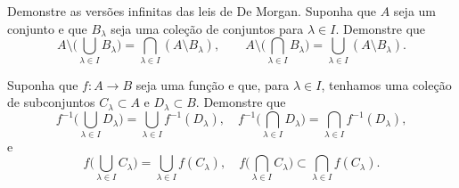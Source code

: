 \begin{exercise}
Demonstre as versões infinitas das leis de De Morgan.
Suponha que $A$ seja um conjunto e que $B_\lambda$ seja uma coleção de
conjuntos para $\lambda \in I$. Demonstre que
\begin{equation*}
A \setminus \biggl(
\bigcup_{\lambda \in I} B_\lambda
\biggr)
=
\bigcap_{\lambda \in I}
(
A \setminus
B_\lambda
) ,
\qquad
A \setminus \biggl(
\bigcap_{\lambda \in I} B_\lambda
\biggr)
=
\bigcup_{\lambda \in I}
(
A \setminus
B_\lambda
) .
\end{equation*}
\end{exercise}

\begin{exercise}
Suponha que $f \colon A \to B$ seja uma função e que, para $\lambda \in I$,
tenhamos uma coleção de subconjuntos $C_\lambda \subset A$ e
$D_\lambda \subset B$. Demonstre que
\begin{equation*}
f^{-1} \biggl(
\bigcup_{\lambda \in I} D_\lambda
\biggr)
=
\bigcup_{\lambda \in I}
f^{-1}(D_\lambda) ,
\quad
f^{-1} \biggl(
\bigcap_{\lambda \in I} D_\lambda
\biggr)
=
\bigcap_{\lambda \in I}
f^{-1}(D_\lambda) ,
\end{equation*}
e
\begin{equation*}
f \biggl(
\bigcup_{\lambda \in I} C_\lambda
\biggr)
=
\bigcup_{\lambda \in I}
f(C_\lambda) ,
\quad
f \biggl(
\bigcap_{\lambda \in I} C_\lambda
\biggr)
\subset
\bigcap_{\lambda \in I}
f(C_\lambda) .
\end{equation*}
\end{exercise}

